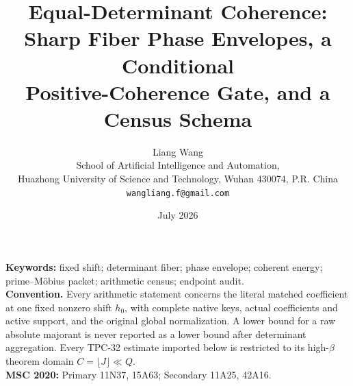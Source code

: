 \documentclass[11pt]{article}
\title{Equal-Determinant Coherence:\\
Sharp Fiber Phase Envelopes, a Conditional\\
Positive-Coherence Gate, and a Census Schema}
\author{Liang Wang\\
School of Artificial Intelligence and Automation,\\
Huazhong University of Science and Technology, Wuhan 430074, P.R. China\\
\texttt{wangliang.f@gmail.com}}
\date{July 2026}
\theoremstyle{remark}
\begin{document}
\maketitle


\noindent\textbf{Keywords:} fixed shift; determinant fiber; phase
envelope; coherent energy; prime--M\"obius packet; arithmetic census;
endpoint audit.\\[0.5em]
\noindent\textbf{Convention.} Every arithmetic statement concerns the
literal matched coefficient at one fixed nonzero shift \(h_0\), with
complete native keys, actual coefficients and active support, and the
original global normalization.  A lower bound for a raw absolute
majorant is never reported as a lower bound after determinant
aggregation.  Every TPC-32 estimate imported below is restricted to
its high-\(\beta\) theorem domain \(C=\lfloor J\rfloor\ll Q\).\\[0.5em]
\noindent\textbf{MSC 2020:} Primary 11N37, 15A63; Secondary 11A25,
42A16.












\begingroup
\small
\raggedright


\endgroup
\end{document}
